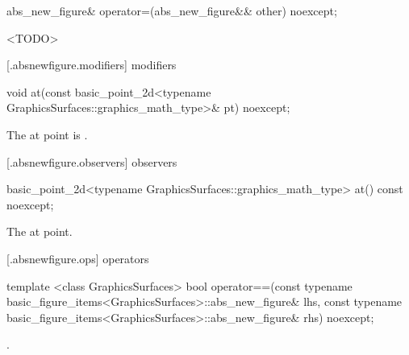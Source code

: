 %
\begin{itemdecl}
abs_new_figure& operator=(abs_new_figure&& other) noexcept;
\end{itemdecl}
\begin{itemdescr}
\pnum
\effects
<TODO>

\pnum
\returns
{}
\end{itemdescr}

 [\iotwod.absnewfigure.modifiers]{ modifiers}%

%
\begin{itemdecl}
void at(const basic_point_2d<typename GraphicsSurfaces::graphics_math_type>& pt) noexcept;
\end{itemdecl}
\begin{itemdescr}
\pnum
\effects
The at point is .
\end{itemdescr}

 [\iotwod.absnewfigure.observers]{ observers}%

%
\begin{itemdecl}
basic_point_2d<typename GraphicsSurfaces::graphics_math_type> at() const noexcept;
\end{itemdecl}
\begin{itemdescr}
\pnum
\returns
The at point.
\end{itemdescr}

 [\iotwod.absnewfigure.ops]{ operators}%

%
\begin{itemdecl}
template <class GraphicsSurfaces>
bool operator==(const typename basic_figure_items<GraphicsSurfaces>::abs_new_figure& lhs,
  const typename basic_figure_items<GraphicsSurfaces>::abs_new_figure& rhs) noexcept;
\end{itemdecl}
\begin{itemdescr}
\pnum
\returns
{}.
\end{itemdescr}
